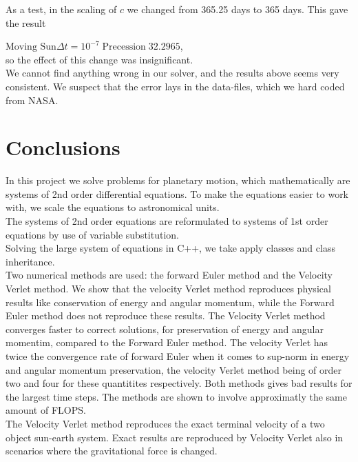 \documentclass{article}
\begin{document}
As a test, in the scaling of $c$ we changed from 365.25 days to 365 days. This gave the result

$\text{Moving Sun} \Delta t = 10^{-7}\; \text{Precession}\; 32.2965$,\\

so the effect of this change was insignificant.\\

We cannot find anything wrong in our solver, and the results above seems very consistent. We suspect that the error lays in the data-files, which we hard coded from NASA.


\section{Conclusions}
In this project we solve problems for planetary motion, which mathematically are systems of 2nd order differential equations. To make the equations easier to work with, we scale the equations to astronomical units.\\

The systems of 2nd order equations are reformulated to systems of 1st order equations by use of variable substitution. \\

Solving the large system of equations in C++, we take apply classes and class inheritance.\\

Two numerical methods are used: the forward Euler method and the Velocity Verlet method. We show that the velocity Verlet method reproduces physical results like conservation of energy and angular momentum, while the Forward Euler method does not reproduce these results. The Velocity Verlet method converges faster to correct solutions, for preservation of energy and angular momentim, compared to the Forward Euler method. The velocity Verlet has twice the convergence rate of forward Euler when it comes to sup-norm in energy and angular momentum preservation, the velocity Verlet method being of order two and four for these quantitites respectively. Both methods gives bad results for the largest time steps. The methods are shown to involve approximatly the same amount of FLOPS.\\

The Velocity Verlet method reproduces the exact terminal velocity of a two object sun-earth system. Exact results are reproduced by Velocity Verlet also in scenarios where the gravitational force is changed. \\
\end{document}
